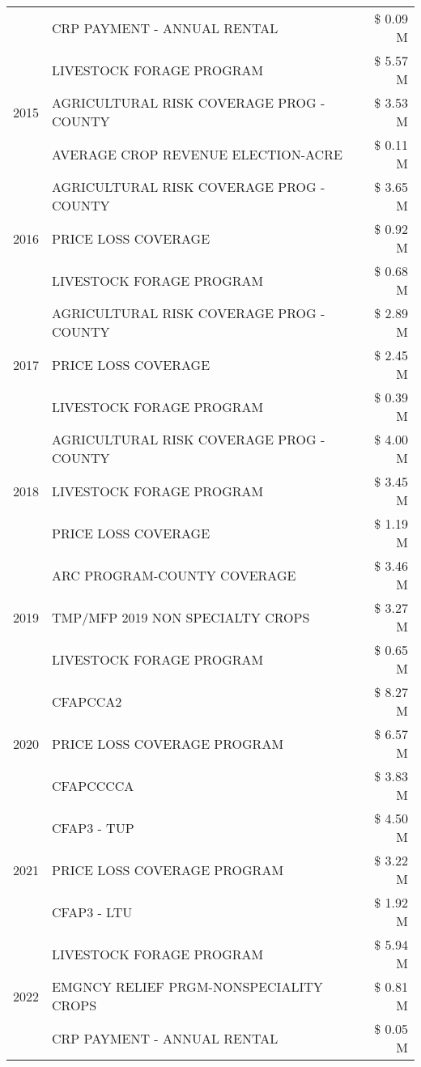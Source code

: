 \begin{tabular}{llr}
 & CRP PAYMENT - ANNUAL RENTAL & \$ 0.09 M \\
\cline{1-3}
\multirow[t]{3}{*}{2015} & LIVESTOCK FORAGE PROGRAM & \$ 5.57 M \\
 & AGRICULTURAL RISK COVERAGE PROG - COUNTY & \$ 3.53 M \\
 & AVERAGE CROP REVENUE ELECTION-ACRE & \$ 0.11 M \\
\cline{1-3}
\multirow[t]{3}{*}{2016} & AGRICULTURAL RISK COVERAGE PROG - COUNTY & \$ 3.65 M \\
 & PRICE LOSS COVERAGE & \$ 0.92 M \\
 & LIVESTOCK FORAGE PROGRAM & \$ 0.68 M \\
\cline{1-3}
\multirow[t]{3}{*}{2017} & AGRICULTURAL RISK COVERAGE PROG - COUNTY & \$ 2.89 M \\
 & PRICE LOSS COVERAGE & \$ 2.45 M \\
 & LIVESTOCK FORAGE PROGRAM & \$ 0.39 M \\
\cline{1-3}
\multirow[t]{3}{*}{2018} & AGRICULTURAL RISK COVERAGE PROG - COUNTY & \$ 4.00 M \\
 & LIVESTOCK FORAGE PROGRAM & \$ 3.45 M \\
 & PRICE LOSS COVERAGE & \$ 1.19 M \\
\cline{1-3}
\multirow[t]{3}{*}{2019} & ARC PROGRAM-COUNTY COVERAGE & \$ 3.46 M \\
 & TMP/MFP 2019 NON SPECIALTY CROPS & \$ 3.27 M \\
 & LIVESTOCK FORAGE PROGRAM & \$ 0.65 M \\
\cline{1-3}
\multirow[t]{3}{*}{2020} & CFAPCCA2 & \$ 8.27 M \\
 & PRICE LOSS COVERAGE PROGRAM & \$ 6.57 M \\
 & CFAPCCCCA & \$ 3.83 M \\
\cline{1-3}
\multirow[t]{3}{*}{2021} & CFAP3 - TUP & \$ 4.50 M \\
 & PRICE LOSS COVERAGE PROGRAM & \$ 3.22 M \\
 & CFAP3 - LTU & \$ 1.92 M \\
\cline{1-3}
\multirow[t]{3}{*}{2022} & LIVESTOCK FORAGE PROGRAM & \$ 5.94 M \\
 & EMGNCY RELIEF PRGM-NONSPECIALITY CROPS & \$ 0.81 M \\
 & CRP PAYMENT - ANNUAL RENTAL & \$ 0.05 M \\
\cline{1-3}
\bottomrule
\end{tabular}

